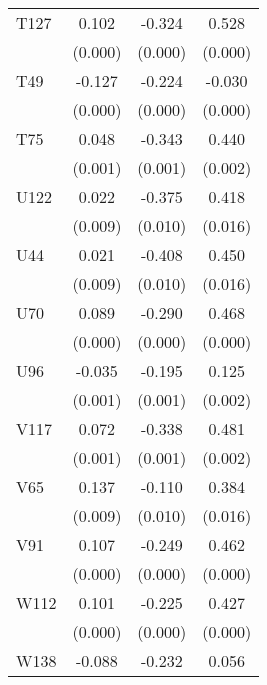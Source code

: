 \begin{table}[htbp]
\begin{tabular}{l*{3}{c}}
T127            &    0.102\sym{***}&   -0.324\sym{***}&    0.528\sym{***}\\
                &  (0.000)         &  (0.000)         &  (0.000)         \\
T49             &   -0.127\sym{***}&   -0.224\sym{***}&   -0.030\sym{***}\\
                &  (0.000)         &  (0.000)         &  (0.000)         \\
T75             &    0.048\sym{***}&   -0.343\sym{***}&    0.440\sym{***}\\
                &  (0.001)         &  (0.001)         &  (0.002)         \\
U122            &    0.022\sym{**} &   -0.375\sym{***}&    0.418\sym{***}\\
                &  (0.009)         &  (0.010)         &  (0.016)         \\
U44             &    0.021\sym{**} &   -0.408\sym{***}&    0.450\sym{***}\\
                &  (0.009)         &  (0.010)         &  (0.016)         \\
U70             &    0.089\sym{***}&   -0.290\sym{***}&    0.468\sym{***}\\
                &  (0.000)         &  (0.000)         &  (0.000)         \\
U96             &   -0.035\sym{***}&   -0.195\sym{***}&    0.125\sym{***}\\
                &  (0.001)         &  (0.001)         &  (0.002)         \\
V117            &    0.072\sym{***}&   -0.338\sym{***}&    0.481\sym{***}\\
                &  (0.001)         &  (0.001)         &  (0.002)         \\
V65             &    0.137\sym{***}&   -0.110\sym{***}&    0.384\sym{***}\\
                &  (0.009)         &  (0.010)         &  (0.016)         \\
V91             &    0.107\sym{***}&   -0.249\sym{***}&    0.462\sym{***}\\
                &  (0.000)         &  (0.000)         &  (0.000)         \\
W112            &    0.101\sym{***}&   -0.225\sym{***}&    0.427\sym{***}\\
                &  (0.000)         &  (0.000)         &  (0.000)         \\
W138            &   -0.088\sym{***}&   -0.232\sym{***}&    0.056\sym{***}\\

\end{tabular}
\end{table}
